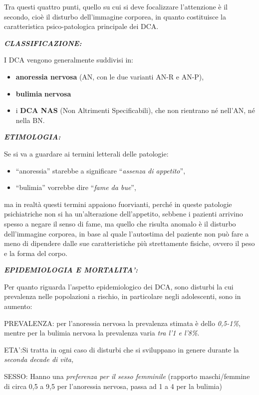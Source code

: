 \documentclass[]{article}
\begin{document}
Tra questi quattro punti, quello su cui si deve focalizzare l'attenzione
è il secondo, cioè il disturbo dell'immagine corporea, in quanto
costituisce la caratteristica psico-patologica principale dei DCA.

\textbf{\emph{CLASSIFICAZIONE:}}

I DCA vengono generalmente suddivisi in:

\begin{itemize}
\item
  \textbf{anoressia nervosa} (AN, con le due varianti AN-R e AN-P),
\item
  \textbf{bulimia} \textbf{nervosa}
\item
  i \textbf{DCA NAS} (Non Altrimenti Specificabili), che non rientrano
  né nell'AN, né nella BN.
\end{itemize}

\textbf{\emph{ETIMOLOGIA:}}

Se si va a guardare ai termini letterali delle patologie:

\begin{itemize}
\item
  ``anoressia'' starebbe a significare ``\emph{assenza di appetito}'',
\item
  ``bulimia'' vorrebbe dire ``\emph{fame da bue}'',
\end{itemize}

ma in realtà questi termini appaiono fuorvianti, perché in queste
patologie psichiatriche non si ha un'alterazione dell'appetito, sebbene
i pazienti arrivino spesso a negare il senso di fame, ma quello che
risulta anomalo è il disturbo dell'immagine corporea, in base al quale
l'autostima del paziente non può fare a meno di dipendere dalle sue
caratteristiche più strettamente fisiche, ovvero il peso e la forma del
corpo.

\textbf{\emph{EPIDEMIOLOGIA E MORTALITA':}}

Per quanto riguarda l'aspetto epidemiologico dei DCA, sono disturbi la
cui prevalenza nelle popolazioni a rischio, in particolare negli
adolescenti, sono in aumento:

PREVALENZA: per l'anoressia nervosa la prevalenza stimata è dello
\emph{0,5-1\%}, mentre per la bulimia nervosa la prevalenza varia
\emph{tra l'1 e l'8\%}.

ETA':Si tratta in ogni caso di disturbi che si sviluppano in genere
durante la \emph{seconda decade di vita,}

SESSO: Hanno una \emph{preferenza per il sesso femminile} (rapporto
maschi/femmine di circa 0,5 a 9,5 per l'anoressia nervosa, passa ad 1 a
4 per la bulimia)
\end{document}
